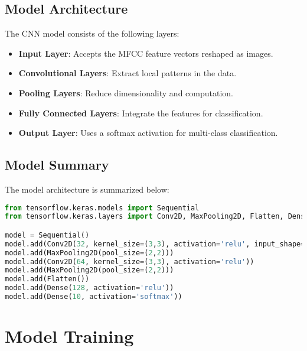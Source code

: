 \documentclass[12pt]{article}
\begin{document}
\subsection{Model Architecture}

The CNN model consists of the following layers:

\begin{itemize}
    \item \textbf{Input Layer}: Accepts the MFCC feature vectors reshaped as images.
    \item \textbf{Convolutional Layers}: Extract local patterns in the data.
    \item \textbf{Pooling Layers}: Reduce dimensionality and computation.
    \item \textbf{Fully Connected Layers}: Integrate the features for classification.
    \item \textbf{Output Layer}: Uses a softmax activation for multi-class classification.
\end{itemize}

\subsection{Model Summary}

The model architecture is summarized below:

\begin{lstlisting}[language=Python, caption=Model Architecture]
from tensorflow.keras.models import Sequential
from tensorflow.keras.layers import Conv2D, MaxPooling2D, Flatten, Dense

model = Sequential()
model.add(Conv2D(32, kernel_size=(3,3), activation='relu', input_shape=(13, 13, 1)))
model.add(MaxPooling2D(pool_size=(2,2)))
model.add(Conv2D(64, kernel_size=(3,3), activation='relu'))
model.add(MaxPooling2D(pool_size=(2,2)))
model.add(Flatten())
model.add(Dense(128, activation='relu'))
model.add(Dense(10, activation='softmax'))
\end{lstlisting}

\newpage




\section{Model Training}
\end{document}
